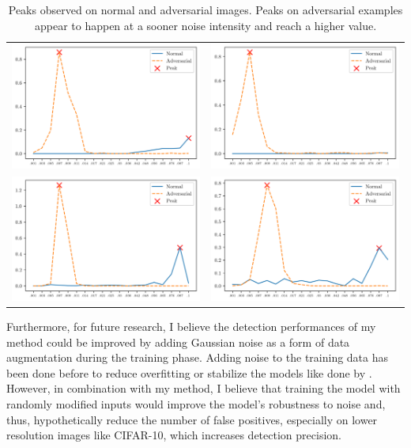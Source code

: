 \begin{table}\centering
    \begin{tabular}{cc}
        \includegraphics[width=.45\linewidth]{Figures/peaks/1.png}  &
        \includegraphics[width=.45\linewidth]{Figures/peaks/3.png}    \\
        \includegraphics[width=.45\linewidth]{Figures/peaks/13.png} &
        \includegraphics[width=.45\linewidth]{Figures/peaks/20.png}   \\
    \end{tabular}
    \caption{Peaks observed on normal and adversarial images. Peaks on
        adversarial examples appear to happen at a sooner noise intensity and
        reach a higher value.}
    \label{fig:peaks}
\end{table}

Furthermore, for future research, I believe the detection performances of my
method could be improved by adding Gaussian noise as a form of data augmentation
during the training phase. Adding noise to the training data has been done
before to reduce overfitting or stabilize the models like done by
\cite{zheng_improving_2016}. However, in combination with my method, I believe
that training the model with randomly modified inputs would improve the model's
robustness to noise and, thus, hypothetically reduce the number of false
positives, especially on lower resolution images like CIFAR-10, which increases
detection precision.